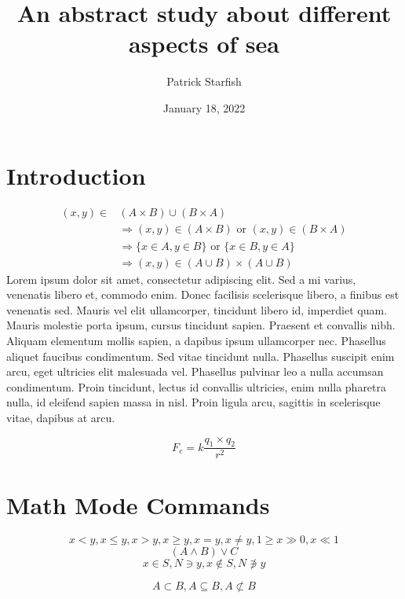\documentclass[a4paper,12pt]{article}
\title{An abstract study about different aspects of sea}
\author{Patrick Starfish}
\date{January 18, 2022}
\begin{document}
	\maketitle
	\tableofcontents
	\section[intro]{Introduction}
	
	\begin{align*}
		(x, y) \in & (A \times B) \cup (B \times A) \\
		&\Rightarrow (x, y) \in (A \times B) \text{ or } (x, y) \in (B \times A) \\
		&\Rightarrow \{ x \in A, y \in B \} \text{ or } \{x \in B, y \in A\} \\
		&\Rightarrow (x, y) \in (A \cup B) \times (A \cup B)
	\end{align*}
	Lorem ipsum dolor sit amet, consectetur adipiscing elit. Sed a mi varius, venenatis libero et, commodo enim. Donec facilisis scelerisque libero, a finibus est venenatis sed. Mauris vel elit ullamcorper, tincidunt libero id, imperdiet quam. Mauris molestie porta ipsum, cursus tincidunt sapien. Praesent et convallis nibh. Aliquam elementum mollis sapien, a dapibus ipsum ullamcorper nec. Phasellus aliquet faucibus condimentum. Sed vitae tincidunt nulla. Phasellus suscipit enim arcu, eget ultricies elit malesuada vel. Phasellus pulvinar leo a nulla accumsan condimentum. Proin tincidunt, lectus id convallis ultricies, enim nulla pharetra nulla, id eleifend sapien massa in nisl. Proin ligula arcu, sagittis in scelerisque vitae, dapibus at arcu.
	
	\begin{equation}
		F_e = k\frac{q_1 \times q_2}{r^2}
	\end{equation}
	
	\section{Math Mode Commands}
	
	$$x < y, x \leq y, x > y, x \geq y, x = y, x \not = y,1 \geq x \gg 0, x \ll 1$$
	$$(A \wedge  B) \vee C$$
	$$x \in S, N \ni y, x \not\in S, N \not\ni y$$
	
	$$A \subset B, A \subseteq B, A \not \subset B$$
	
\end{document}
